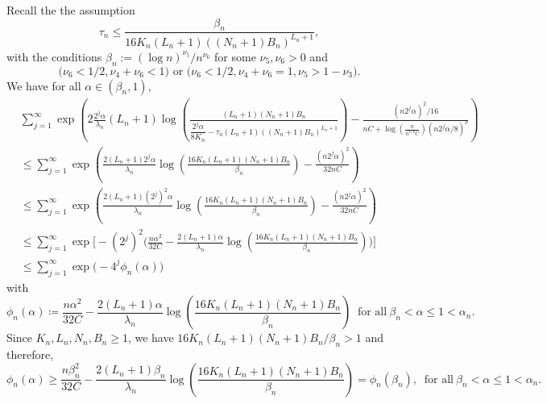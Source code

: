 \documentclass[10pt,twoside]{article}
\numberwithin{equation}{section}
\begin{document}
Recall the    the assumption  
%
\[\tau_n \leq \dfrac{ \beta_n }{16  K_n  (L_n + 1)((N_n + 1) B_n)^{L_n +1}},  \]
%
with  the conditions $ \beta_n := (\log n)^{\nu_5}/n^{\nu_6}$  for some  $\nu_5, \nu_6 >0$
%
and
%
\begin{equation}\label{assump_beta}
\Big( \nu_6 < 1/2, \nu_4 + \nu_6 <1  \Big) \text{ or } \Big( \nu_6 < 1/2, \nu_4 + \nu_6 =1, \nu_5 > 1-\nu_3 \Big).
\end{equation}
%
We have
%
for  all $\alpha \in (\beta_n, 1)$, 
%
\begin{align}
\nonumber & \sum_{j=1}^\infty \exp \left( 2 \frac{2^j \alpha}{ \lambda_n}(L_n + 1)\log \left(\frac{ (L_n + 1)(N_n + 1)B_n}{ \dfrac{2^j \alpha}{8 K_n} - \tau_n (L_n + 1)((N_n + 1) B_n)^{L_n +1} } \right)  -\frac{(n 2^j \alpha)^2/16}{n C + \log (\frac{n}{n^{1/4} C})(n 2^j \alpha/8)^\nu} \right)
\\
\nonumber &\leq \sum_{j=1}^\infty \exp\left( \frac{2(L_{n} + 1 )2^{j}\alpha}{\lambda_{n}}\log\left(\frac{ 16 K_{n}(L_{n} + 1)(N_{n} + 1)B_{n}}{\beta_n}\right)  -\frac{(n2^{j}\alpha)^{2}}{32 n C}\right) 
\\
\nonumber & \leq \sum_{j=1}^{\infty} \exp\left( \frac{2(L_{n} + 1 )(2^{j})^2\alpha}{\lambda_{n}}\log\left(\frac{16 K_{n}(L_{n} + 1)(N_{n} + 1)B_{n}}{\beta_n}\right)  -\frac{(n2^{j}\alpha)^{2}}{32 n C}\right) 
\\
 \nonumber  & \leq \sum_{j=1}^{\infty} \exp\Bigg[ - (2^j)^2 \Bigg( \frac{n \alpha^{2}}{ 32 C } -  \frac{2(L_n + 1 )\alpha}{\lambda_n}\log\left(\frac{16 K_n (L_n + 1)(N_n + 1)B_n}{\beta_n}\right)  \Bigg) \Bigg] \\
\label{ineq_exp_phi_n} & \leq \sum_{j=1}^{\infty} \exp\big(- 4^j \phi_n (\alpha) \big)
\end{align}
%
%
with 
%
\begin{equation}\label{def_phi_n}
 \phi_n(\alpha) \coloneqq  \frac{n \alpha^{2}}{32 C} -  \frac{2(L_n + 1 )\alpha}{\lambda_n}\log\left(\frac{16 K_n (L_n + 1)(N_n + 1)B_n}{\beta_n}\right)  ~ \text{ for all}  ~ \beta_n < \alpha\leq 1 < \alpha_n.
\end{equation}
%
Since $K_n, L_n, N_n, B_n \geq 1$, we have $16 K_n (L_n + 1)(N_n + 1)B_n / \beta_n >1$ and therefore,
%
%
\begin{equation}\label{eq_phi_n_alpha}
\phi_n (\alpha) \geq  \frac{n \beta_n^ 2}{32 C} -  \frac{2(L_n + 1 )\beta_n}{\lambda_n}\log\left(\frac{16 K_n (L_n + 1)(N_n + 1)B_n}{\beta_n}\right) = \phi_n (\beta_n), ~   \text{ for all} ~ \beta_n < \alpha\leq 1 < \alpha_n. 
 \end{equation}
\end{document}

